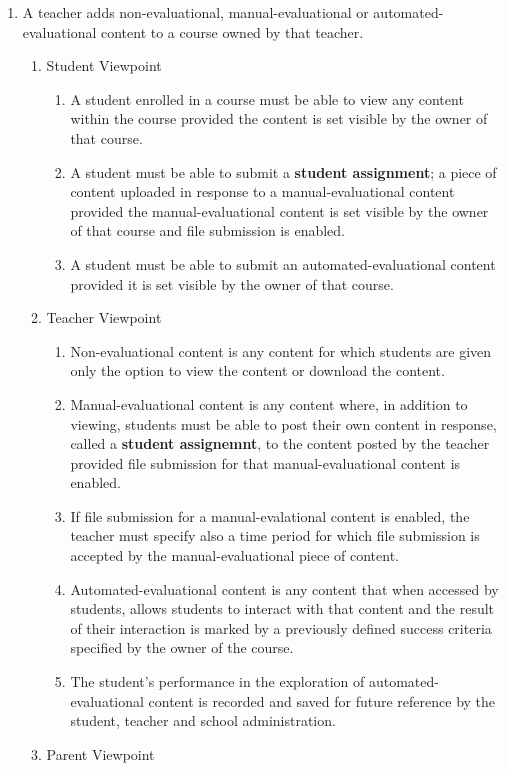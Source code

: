 \documentclass[]{article}
\begin{document}
\begin{enumerate}[{BE}1.]
	\item A teacher adds non-evaluational, manual-evaluational or
automated-evaluational content to a course owned by that teacher.
	\begin{enumerate}[{VP1}.1]
		\item Student Viewpoint
			\begin{enumerate}
				\item A student enrolled in a course must be able to view any content within
the course provided the content is set visible by the owner of that course.
				\item A student must be able to submit a \textbf{student assignment}; a
piece of content uploaded in response to a manual-evaluational content provided
the manual-evaluational content is set visible by the owner of that course and
file submission is enabled.
				\item A student must be able to submit an automated-evaluational content
provided it is set visible by the owner of that course.
			\end{enumerate}
		\item Teacher Viewpoint
			\begin{enumerate}
				\item Non-evaluational content is any content for which students are given
only the option to view the content or download the content.
				\item Manual-evaluational content is any content where, in addition to
viewing, students must be able to post their own content in response, called a
\textbf{student assignemnt}, to the content posted by the teacher provided file
submission for that manual-evaluational content is enabled.
				\item If file submission for a manual-evalational content is enabled, the
teacher must specify also a time period for which file submission is accepted by
the manual-evaluational piece of content.
				\item Automated-evaluational content is any content that when accessed by
students, allows students to interact with that content and the result of their
interaction is marked by a previously defined success criteria specified by the
owner of the course.
				\item The student's performance in the exploration of automated-evaluational
content is recorded and saved for future reference by the student, teacher and
school administration.
			\end{enumerate}
		\item Parent Viewpoint

\end{enumerate}
\end{enumerate}
\end{document}
